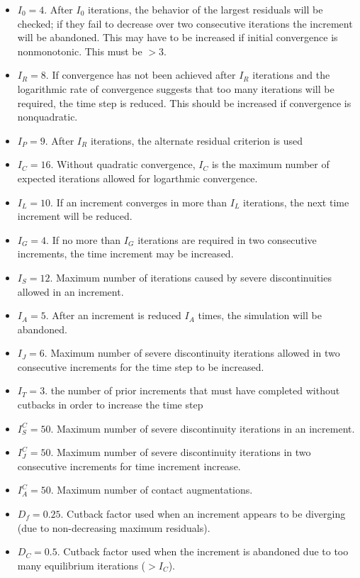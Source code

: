 \documentclass[10pt,letterpaper,oneside]{report}
\begin{document}
\begin{itemize}
\item $I_0 = 4$.  After $I_0$ iterations, the behavior of the largest residuals will be checked; if they fail to decrease over two consecutive iterations the increment will be abandoned.  This may have to be increased if initial convergence is nonmonotonic.  This must be $> 3$.
\item $I_R = 8$.  If convergence has not been achieved after $I_R$ iterations and the logarithmic rate of convergence suggests that too many iterations will be required, the time step is reduced.  This should be increased if convergence is nonquadratic.  
\item $I_P = 9$.  After $I_R$ iterations, the alternate residual criterion is used
\item $I_C = 16$.  Without quadratic convergence, $I_C$ is the maximum number of expected iterations allowed for logarthmic convergence.
\item $I_L = 10$.  If an increment converges in more than $I_L$ iterations, the next time increment will be reduced. 
\item $I_G = 4$.  If no more than $I_G$ iterations are required in two consecutive increments, the time increment may be increased.
\item $I_S = 12$.  Maximum number of iterations caused by severe discontinuities allowed in an increment.
\item $I_A = 5$.  After an increment is reduced $I_A$ times, the simulation will be abandoned.  
\item $I_J =6 $.  Maximum number of severe discontinuity iterations allowed in two consecutive increments for the time step to be increased.
\item $I_T = 3$. the number of prior increments that must have completed without cutbacks in order to increase the time step
\item $I_S^C = 50$.  Maximum number of severe discontinuity iterations in an increment.
\item $I_J^C = 50$.  Maximum number of severe discontinuity iterations in two consecutive increments for time increment increase.
\item $I_A^C = 50$.  Maximum number of contact augmentations.
\item $D_f = 0.25$.  Cutback factor used when an increment appears to be diverging (due to non-decreasing maximum residuals).
\item $D_C = 0.5$.   Cutback factor used when the increment is abandoned due to too many equilibrium iterations ($ > I_C$).

\end{itemize}
\end{document}
